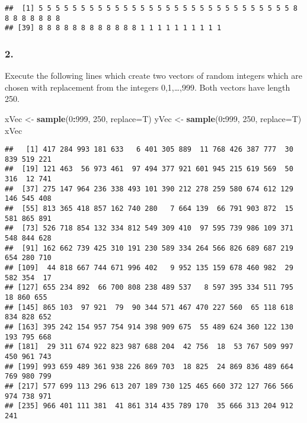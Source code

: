 \documentclass[
]{article}
\newenvironment{Shaded}{\begin{snugshade}}{\end{snugshade}}
\newcommand{\AttributeTok}[1]{\textcolor[rgb]{0.13,0.29,0.53}{#1}}
\newcommand{\DecValTok}[1]{\textcolor[rgb]{0.00,0.00,0.81}{#1}}
\newcommand{\FunctionTok}[1]{\textcolor[rgb]{0.13,0.29,0.53}{\textbf{#1}}}
\newcommand{\NormalTok}[1]{#1}
\newcommand{\OtherTok}[1]{\textcolor[rgb]{0.56,0.35,0.01}{#1}}
\newcommand{\SpecialCharTok}[1]{\textcolor[rgb]{0.81,0.36,0.00}{\textbf{#1}}}
\begin{document}
\begin{verbatim}
##  [1] 5 5 5 5 5 5 5 5 5 5 5 5 5 5 5 5 5 5 5 5 5 5 5 5 5 5 5 5 5 5 8 8 8 8 8 8 8 8
## [39] 8 8 8 8 8 8 8 8 8 8 8 8 1 1 1 1 1 1 1 1 1 1
\end{verbatim}

\subsubsection{2.}\label{section-1}

Execute the following lines which create two vectors of random integers
which are chosen with replacement from the integers 0,1,\ldots,999. Both
vectors have length 250.

\begin{Shaded}
\begin{Highlighting}[]
\NormalTok{ xVec }\OtherTok{\textless{}{-}} \FunctionTok{sample}\NormalTok{(}\DecValTok{0}\SpecialCharTok{:}\DecValTok{999}\NormalTok{, }\DecValTok{250}\NormalTok{, }\AttributeTok{replace=}\NormalTok{T)}
\NormalTok{ yVec }\OtherTok{\textless{}{-}} \FunctionTok{sample}\NormalTok{(}\DecValTok{0}\SpecialCharTok{:}\DecValTok{999}\NormalTok{, }\DecValTok{250}\NormalTok{, }\AttributeTok{replace=}\NormalTok{T)}
\NormalTok{ xVec}
\end{Highlighting}
\end{Shaded}

\begin{verbatim}
##   [1] 417 284 993 181 633   6 401 305 889  11 768 426 387 777  30 839 519 221
##  [19] 121 463  56 973 461  97 494 377 921 601 945 215 619 569  50 316  12 741
##  [37] 275 147 964 236 338 493 101 390 212 278 259 580 674 612 129 146 545 408
##  [55] 813 365 418 857 162 740 280   7 664 139  66 791 903 872  15 581 865 891
##  [73] 526 718 854 132 334 812 549 309 410  97 595 739 986 109 371 548 844 628
##  [91] 162 662 739 425 310 191 230 589 334 264 566 826 689 687 219 654 280 710
## [109]  44 818 667 744 671 996 402   9 952 135 159 678 460 982  29 582 354  17
## [127] 655 234 892  66 700 808 238 489 537   8 597 395 334 511 795  18 860 655
## [145] 865 103  97 921  79  90 344 571 467 470 227 560  65 118 618 834 828 652
## [163] 395 242 154 957 754 914 398 909 675  55 489 624 360 122 130 193 795 668
## [181]  29 311 674 922 823 987 688 204  42 756  18  53 767 509 997 450 961 743
## [199] 993 659 489 361 938 226 869 703  18 825  24 869 836 489 664 769 980 799
## [217] 577 699 113 296 613 207 189 730 125 465 660 372 127 766 566 974 738 971
## [235] 966 401 111 381  41 861 314 435 789 170  35 666 313 204 912 241
\end{verbatim}
\end{document}

